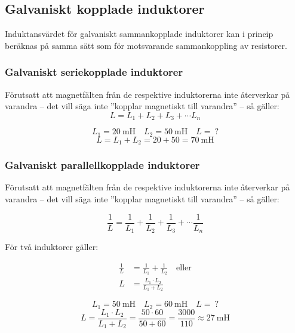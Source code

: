 \subsection{Galvaniskt kopplade induktorer}
\label{galvaniskt_kopplade_induktorer}

Induktansvärdet för galvaniskt sammankopplade induktorer kan i princip
beräknas på samma sätt som för motsvarande sammankoppling av resistorer.

\subsubsection{Galvaniskt seriekopplade induktorer}

Förutsatt att magnetfälten från de respektive induktorerna inte återverkar på
varandra -- det vill säga inte ''kopplar magnetiskt till varandra'' -- så
gäller:
%
\[L = L_1 + L_2 + L_3 + \cdots L_n\]
%
\begin{exempelbox}
\noindent
\[ L_1 = \qty{20}{\milli\henry} \quad L_2 = \qty{50}{\milli\henry} \quad L =\ ? \]
\tcblower
\noindent
\[ L = L_1 + L_2 = 20 + 50 = \qty{70}{\milli\henry} \]
\end{exempelbox}

\subsubsection{Galvaniskt parallellkopplade induktorer}

Förutsatt att magnetfälten från de respektive induktorerna inte återverkar på
varandra -- det vill säga inte ''kopplar magnetiskt till varandra'' -- så
gäller:

\[
\frac{1}{L} = \frac{1}{L_1} + \frac{1}{L_2} + \frac{1}{L_3} +
\cdots \frac{1}{L_n}
\]

För två induktorer gäller:

\begin{align*}
  \frac{1}{L} &= \frac{1}{L_1} + \frac{1}{L_2} \quad \text{eller} \\
  L &= \frac{L_1 \cdot L_2}{L_1 + L_2}
\end{align*}

\begin{exempelbox}
\noindent
\[L_1 = \qty{50}{\milli\henry} \quad L_2 = \qty{60}{\milli\henry} \quad L =\ ?\]
\tcblower
\noindent
\[
  L = \frac{L_1 \cdot L_2}{L_1 + L_2}
  = \frac{50 \cdot 60}{50 + 60}
  = \frac{3000}{110}
  \approx \qty{27}{\milli\henry}
\]
\end{exempelbox}


